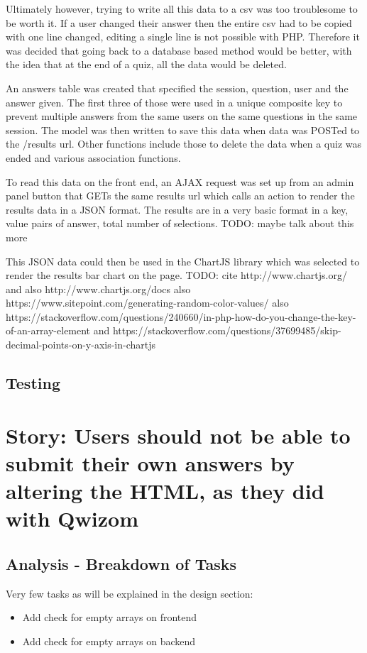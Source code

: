 \documentclass{article}
\begin{document}
Ultimately however, trying to write all this data to a csv was too troublesome to be worth it. If a user changed their answer then the entire csv had to be copied with one line changed, editing a single line is not possible with PHP. Therefore it was decided that going back to a database based method would be better, with the idea that at the end of a quiz, all the data would be deleted.

An answers table was created that specified the session, question, user and the answer given. The first three of those were used in a unique composite key to prevent multiple answers from the same users on the same questions in the same session. The model was then written to save this data when data was POSTed to the /results url. Other functions include those to delete the data when a quiz was ended and various association functions.

To read this data on the front end, an AJAX request was set up from an admin panel button that GETs the same results url which calls an action to render the results data in a JSON format. The results are in a very basic format in a key, value pairs of answer, total number of selections. TODO: maybe talk about this more

This JSON data could then be used in the ChartJS library which was selected to render the results bar chart on the page. TODO: cite http://www.chartjs.org/ and also http://www.chartjs.org/docs also https://www.sitepoint.com/generating-random-color-values/ also https://stackoverflow.com/questions/240660/in-php-how-do-you-change-the-key-of-an-array-element and https://stackoverflow.com/questions/37699485/skip-decimal-points-on-y-axis-in-chartjs
\subsection{Testing}
\newpage

\section{Story: Users should not be able to submit their own answers by altering the HTML, as they did with Qwizom}
\subsection{Analysis - Breakdown of Tasks}
Very few tasks as will be explained in the design section:
\begin{itemize}
	\item Add check for empty arrays on frontend
	\item Add check for empty arrays on backend
\end{itemize}
\end{document}
